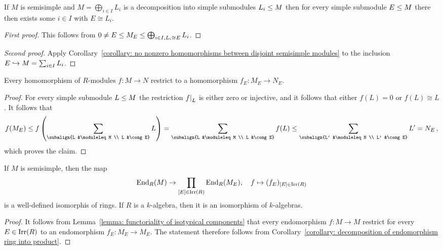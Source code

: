 \begin{lemma}
  If $M$ is semisimple and $M = \bigoplus_{i \in I} L_i$ is a decomposition into simple submodules $L_i \leq M$ then for every simple submodule $E \leq M$ there then exists some $i \in I$ with $E \cong L_i$.
\end{lemma}


\begin{proof}[First proof]
  This follows from $0 \neq E \leq M_E \leq \bigoplus_{i \in I, L_i \cong E} L_i$.
\end{proof}


\begin{proof}[Second proof]
  Apply Corollary~\ref{corollary: no nonzero homomorphisms between disjoint semisimple modules} to the inclusion $E \hookrightarrow M = \sum_{i \in I} L_i$.  
\end{proof}


\begin{lemma}
  \label{lemma: functoriality of isotypical components}
  Every homomorphism of $R$-modules $f \colon M \to N$ restrict to a homomorphism $f_E \colon M_E \to N_E$.
\end{lemma}


\begin{proof}
  For every simple submodule $L \leq M$ the restriction $\restrict{f}{L}$ is either zero or injective, and it follows that either $f(L) = 0$ or $f(L) \cong L$.
  It follows that
  \[
                f(M_E)
    \moduleleq  f
                \left(
                  \sum_{\subalign{L &\moduleleq M \\ L &\cong E}} L
                \right)
    =           \sum_{\subalign{L &\moduleleq M \\ L &\cong E}} f(L)
    \moduleleq  \sum_{\subalign{L' &\moduleleq N \\ L' &\cong E}} L'
    =           N_E \,,
  \]
  which proves the claim.
\end{proof}


\begin{corollary}
  \label{corollary: endomorphism ring of semisimple module}
  If $M$ is semisimple, then the map
  \[
            \operatorname{End}_R(M)
    \to     \prod_{[E] \in \operatorname{Irr}(R)} \operatorname{End}_R(M_E),
    \quad   f
    \mapsto (f_E)_{[E] \in \operatorname{Irr}(R)}
  \]
  is a well-defined isomorphis of rings.
  If $R$ is a $k$-algebra, then it is an isomorphism of $k$-algebras.
\end{corollary}


\begin{proof}
  It follows from Lemma~\ref{lemma: functoriality of isotypical components} that every endomorphism $f \colon M \to M$ restrict for every $E \in \operatorname{Irr}(R)$ to an endomorphism $f_E \colon M_E \to M_E$.
  The statement therefore follows from Corollary~\ref{corollary: decomposition of endomorphism ring into product}.
\end{proof}





